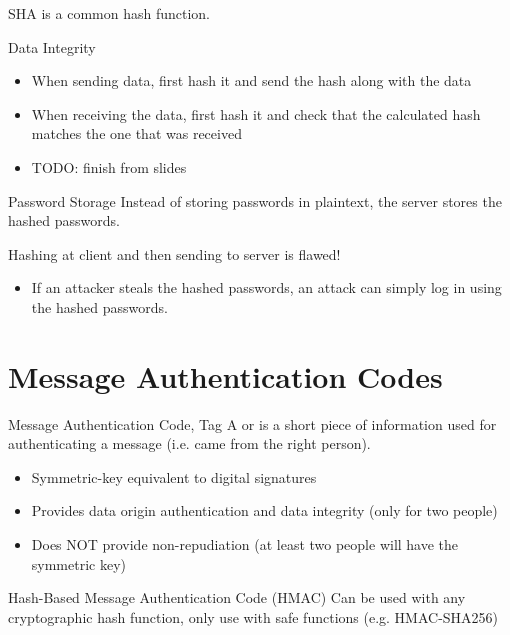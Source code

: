 \documentclass[12pt]{report}
\begin{document}
\begin{dfnbox}{SHA}{}
     is a common hash function.
\end{dfnbox}

\begin{exbox}{Data Integrity}{}
    \begin{itemize}
        \item When sending data, first hash it and send the hash along with the data
        \item When receiving the data, first hash it and check that the calculated hash matches the one that was received
        \item TODO: finish from slides
    \end{itemize}
\end{exbox}

\begin{exbox}{Password Storage}{}
    Instead of storing passwords in plaintext, the server stores the hashed passwords.

    Hashing at client and then sending to server is flawed!
    \begin{itemize}
        \item If an attacker steals the hashed passwords, an attack can simply log in using the hashed passwords.
    \end{itemize}
\end{exbox}

\section{Message Authentication Codes}

\begin{dfnbox}{Message Authentication Code, Tag}{}
    A  or  is a short piece of information used for authenticating a message (i.e. came from the right person).
\end{dfnbox}

\begin{itemize}[noitemsep]
    \item Symmetric-key equivalent to digital signatures
    \item Provides data origin authentication and data integrity (only for two people)
    \item Does NOT provide non-repudiation (at least two people will have the symmetric key)
\end{itemize}

\begin{dfnbox}{Hash-Based Message Authentication Code (HMAC)}{}
    Can be used with any cryptographic hash function, only use with safe functions (e.g. HMAC-SHA256)
\end{dfnbox}
\end{document}
